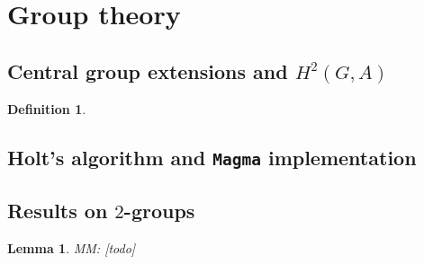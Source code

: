 \documentclass{dcthesis}
\newcommand{\CC}{\mathbb C}
\newcommand{\mm}[1]{{\color{blue} \sf MM: [#1]}}
\newtheorem{lemma}[prop]{Lemma}
\theoremstyle{definition}
\newtheorem{definition}[prop]{Definition}
\theoremstyle{remark}
\numberwithin{equation}{section}
\numberwithin{figure}{section}
\begin{document}
{  \section{Group theory}{
    \subsection{Central group extensions and $H^2(G,A)$}{
      \begin{definition}
        \label{def:isoextentions}
      \end{definition}
    }
    \subsection{Holt's algorithm and \texttt{Magma} implementation}{
      \label{subsec:holtsalgorithm}
    }
    \subsection{Results on $2$-groups}{
      \begin{lemma}\label{lem:2groupfiltration}
        \mm{todo}
      \end{lemma}
    }
  }
}
\end{document}
